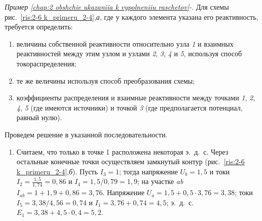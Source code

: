 \begin{small} %
	
	\label{exmpl:2-4}
	\vspace{1pc}
	\textit{Пример \ref*{chap:2 obshchie ukazaniia k vypolneniiu raschetov}-}.
	Для схемы рис.~\ref{ris:2-6 k_primeru_2-4},\textit{а}, где у каждого элемента указана его реактивность, требуется определить:
	

	\begin{enumerate}
		\renewcommand{\labelenumi}{\asbuk{enumi})}  %
		\item величины собственной реактивности относительно узла \textit{1} и взаимных реактивностей между этим узлом и узлами \textit{2}, \textit{3}, \textit{4} и \textit{5}, используя способ токораспределения;
		\item те же величины используя способ преобразования схемы;
		\item коэффициенты распределения и взаимные реактивности между точками \textit{1}, \textit{2}, \textit{4}, \textit{5} (где имеются источники) и точкой \textit{3} (где предполагается потенциал, равный нулю).		
	\end{enumerate}

	Проведем решение в указанной последовательности.

	\begin{enumerate}
		\renewcommand{\labelenumi}{\asbuk{enumi})}
		\item Считаем, что только в точке 1 расположена некоторая э.~д.~с. Через остальные конечные точки осуществляем замкнутый контур (рис.~\ref{ris:2-6 k_primeru_2-4},\textit{б}). Пусть $ I_3 = 1 $; тогда напряжение $ U_b = 1,5 $ и токи $ I_2 = \frac{1,5}{1,74} = 0,86 $ и $ I_4 = 1,5 / 0,79 = 1,9 $; на участке \textit{ab} $ I_{ab} = 1 + 1,9 + 0,86 = 3,76 $. Напряжение $ U_a = 1,5 + 0,5 \cdot 3,76 = 3,38 $; токи $ I_5 = 3,38 / 4,56 = 0,74 $ и $ I_1 = 3,76 + 0,74 = 4,5 $; э.~д.~с. $ E_1 = 3,38 + 4,5 \cdot 0,4 = 5,2 $.
		

\end{enumerate}
\end{small}
